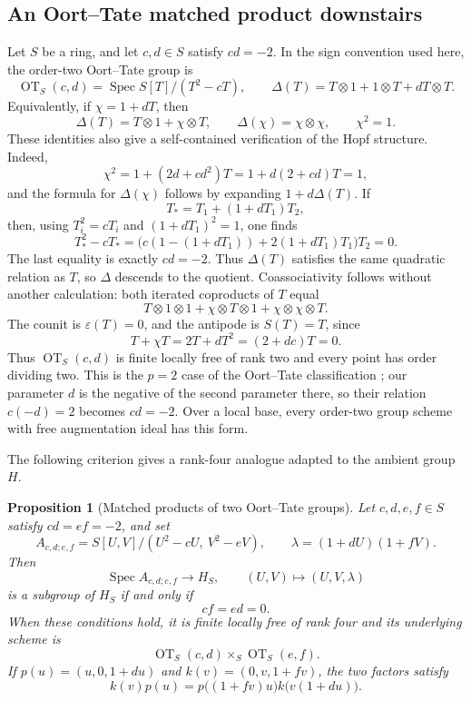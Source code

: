 \documentclass[11pt]{amsart}
\newtheorem{proposition}[theorem]{Proposition}
\theoremstyle{remark}
\newcommand{\Spec}{\operatorname{Spec}}
\newcommand{\eps}{\varepsilon}
\newcommand{\ot}{\otimes}
\begin{document}
\subsection{An Oort--Tate matched product downstairs}

Let \(S\) be a ring, and let \(c,d\in S\) satisfy \(cd=-2\).  In the
sign convention used here, the order-two Oort--Tate group is
\begin{equation}\label{eq:OT2}
 \operatorname{OT}_S(c,d)
 =
 \Spec S[T]/(T^2-cT),
 \qquad
 \Delta(T)
 =T\ot1+1\ot T+dT\ot T.
\end{equation}
Equivalently, if \(\chi=1+dT\), then
\[
 \Delta(T)=T\ot1+\chi\ot T,
 \qquad
 \Delta(\chi)=\chi\ot\chi,
 \qquad
 \chi^2=1.
\]
These identities also give a self-contained verification of the Hopf
structure.  Indeed,
\[
 \chi^2
 =1+(2d+cd^2)T
 =1+d(2+cd)T
 =1,
\]
and the formula for \(\Delta(\chi)\) follows by expanding
\(1+d\Delta(T)\).  If
\[
 T_*=T_1+(1+dT_1)T_2,
\]
then, using \(T_i^2=cT_i\) and \((1+dT_1)^2=1\), one finds
\[
 T_*^2-cT_*
 =
 \bigl(c(1-(1+dT_1))+2(1+dT_1)T_1\bigr)T_2
 =0.
\]
The last equality is exactly \(cd=-2\).
Thus \(\Delta(T)\) satisfies the same quadratic relation as \(T\), so
\(\Delta\) descends to the quotient.  Coassociativity follows without
another calculation: both iterated coproducts of \(T\) equal
\[
 T\ot1\ot1+\chi\ot T\ot1+\chi\ot\chi\ot T.
\]
The counit is \(\eps(T)=0\), and the antipode is
\(S(T)=T\), since
\[
 T+\chi T=2T+dT^2=(2+dc)T=0.
\]
Thus \(\operatorname{OT}_S(c,d)\) is finite locally free of rank two
and every point has order dividing two.
This is the \(p=2\) case of the Oort--Tate classification
\cite[Introduction]{OortTate}; our parameter \(d\) is the negative of
the second parameter there, so their relation \(c(-d)=2\) becomes
\(cd=-2\).  Over a local base, every order-two group scheme with free
augmentation ideal has this form.

The following criterion gives a rank-four analogue adapted to the
ambient group \(H\).

\begin{proposition}[Matched products of two Oort--Tate groups]
\label{prop:OT-matched}
Let \(c,d,e,f\in S\) satisfy \(cd=ef=-2\), and set
\[
 A_{c,d;e,f}
 =
 S[U,V]/(U^2-cU,\ V^2-eV),
 \qquad
 \lambda=(1+dU)(1+fV).
\]
Then
\begin{equation}\label{eq:OT-matched-graph}
 \Spec A_{c,d;e,f}\longrightarrow H_S,
 \qquad
 (U,V)\longmapsto(U,V,\lambda)
\end{equation}
is a subgroup of \(H_S\) if and only if
\begin{equation}\label{eq:OT-matched-conditions}
 cf=ed=0.
\end{equation}
When these conditions hold, it is finite locally free of rank four and
its underlying
scheme is
\[
 \operatorname{OT}_S(c,d)
 \times_S
 \operatorname{OT}_S(e,f).
\]
If \(p(u)=(u,0,1+du)\) and \(k(v)=(0,v,1+fv)\), the two factors satisfy
\begin{equation}\label{eq:OT-refactor}
 k(v)p(u)
 =
 p\bigl((1+fv)u\bigr)
 k\bigl(v(1+du)\bigr).
\end{equation}
\end{proposition}
\end{document}
